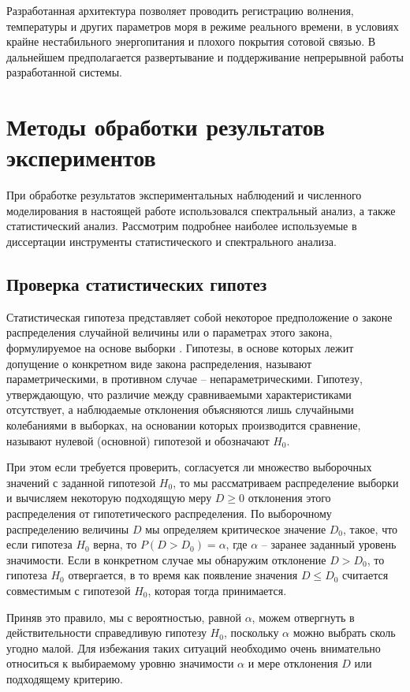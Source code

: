 Разработанная архитектура позволяет проводить регистрацию волнения, температуры и других параметров моря в режиме реального времени, в условиях крайне нестабильного энергопитания и плохого покрытия сотовой связью. В дальнейшем предполагается развертывание и поддерживание непрерывной работы разработанной системы.
\section{Методы обработки результатов экспериментов}


При обработке результатов экспериментальных наблюдений и численного моделирования в настоящей работе использовался спектральный анализ, а также статистический анализ. Рассмотрим подробнее наиболее используемые в диссертации инструменты статистического и спектрального анализа.

\subsection{Проверка статистических гипотез}

Статистическая гипотеза представляет собой некоторое предположение о законе распределения случайной величины или о параметрах этого закона, формулируемое на основе выборки \cite{gmurman, leman, hodasev}. Гипотезы, в основе которых лежит допущение о конкретном виде закона распределения, называют параметрическими, в противном случае – непараметрическими. Гипотезу, утверждающую, что различие между сравниваемыми характеристиками отсутствует, а наблюдаемые отклонения объясняются лишь случайными колебаниями в выборках, на основании которых производится сравнение, называют нулевой (основной) гипотезой и обозначают $H_0$.

При этом если требуется проверить, согласуется ли множество выборочных значений с заданной гипотезой $H_0$, то мы рассматриваем распределение выборки и вычисляем некоторую подходящую меру $D\ge0$ отклонения этого распределения от гипотетического распределения. По выборочному распределению величины $D$ мы определяем критическое значение $D_0$, такое, что если гипотеза $H_0$  верна, то $P(D>D_0)=\alpha$, где $\alpha$ -- заранее заданный уровень значимости. Если в конкретном случае мы обнаружим отклонение $D>D_0$, то гипотеза $H_0$ отвергается, в то время как появление значения $D\le D_0$ считается совместимым с гипотезой $H_0$, которая тогда принимается.

Приняв это правило, мы с вероятностью, равной $\alpha$, можем отвергнуть в действительности справедливую гипотезу $H_0$, поскольку $\alpha$ можно выбрать сколь угодно малой. Для избежания таких ситуаций необходимо очень внимательно относиться к выбираемому уровню значимости $\alpha$ и мере отклонения $D$ или подходящему критерию.

